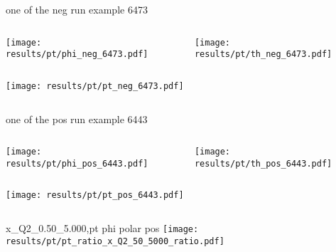 \begin{frame}{one of the neg run example 6473}
\begin{columns}
\begin{column}[T]{0.5\textwidth}
\texttt{[image: results/pt/phi\_neg\_6473.pdf]}
\end{column}
\begin{column}[T]{0.5\textwidth}
\texttt{[image: results/pt/th\_neg\_6473.pdf]}
\end{column}
\end{columns}
\begin{columns}
\begin{column}[T]{0.5\textwidth}
\texttt{[image: results/pt/pt\_neg\_6473.pdf]}
\end{column}
\begin{column}[T]{0.5\textwidth}
\end{column}
\end{columns}
\end{frame}
\begin{frame}{one of the pos run example 6443}
\begin{columns}
\begin{column}[T]{0.5\textwidth}
\texttt{[image: results/pt/phi\_pos\_6443.pdf]}
\end{column}
\begin{column}[T]{0.5\textwidth}
\texttt{[image: results/pt/th\_pos\_6443.pdf]}
\end{column}
\end{columns}
\begin{columns}
\begin{column}[T]{0.5\textwidth}
\texttt{[image: results/pt/pt\_pos\_6443.pdf]}
\end{column}
\begin{column}[T]{0.5\textwidth}
\end{column}
\end{columns}
\end{frame}
\begin{frame}{x\_Q2\_0.50\_5.000,pt phi polar pos}
\texttt{[image: results/pt/pt\_ratio\_x\_Q2\_50\_5000\_ratio.pdf]}
\end{frame}
